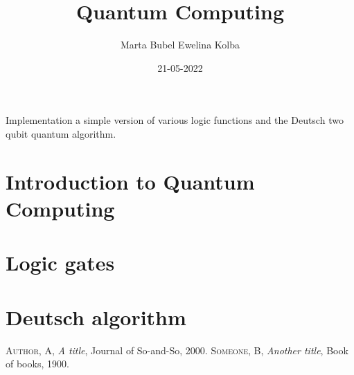 \documentclass{article}
\title{Quantum Computing}
\author{Marta Bubel Ewelina Kolba}
\date{21-05-2022}
\begin{document}
\maketitle
Implementation a simple version of various logic functions and the Deutsch two qubit quantum algorithm.
\newpage
\renewcommand{\contentsname}{Table of contents}
\tableofcontents
\newpage
\section{Introduction to Quantum Computing}
\newpage
\section{Logic gates}
\newpage
\section{Deutsch algorithm}
\newpage
\begin{thebibliography}{x}
    {\scshape Author, A}, {\itshape A title}, Journal of So-and-So, 2000.
    {\scshape Someone, B}, {\itshape Another title}, Book of books, 1900.
\end{thebibliography}
\end{document}
